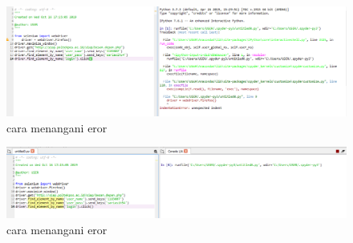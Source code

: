\begin{enumerate}
\begin{figure}[h]
\includegraphics[scale=0.8]{figure/identasi1.png}
\center
\caption{cara menangani eror}
\end{figure}

\begin{figure}[h]
\includegraphics[scale=0.8]{figure/identasi2.png}
\center
\caption{cara menangani eror}
\end{figure}

\end{enumerate}